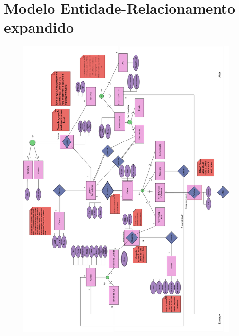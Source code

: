 \section{Modelo Entidade-Relacionamento expandido}
\begin{figure}[ht!]
    \centering
    \includegraphics[scale=2]{images/Mer_VF.png}
    \label{fig:MER}
\end{figure}